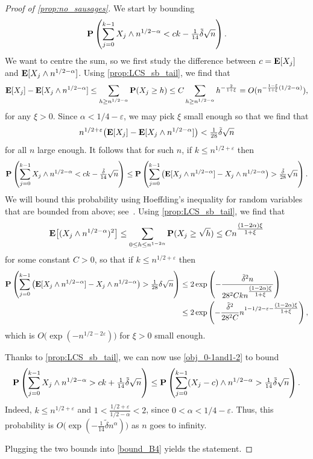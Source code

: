 \documentclass[11pt,reqno]{amsart}
\newcommand{\eps}{\varepsilon}
\begin{document}
\begin{proof}[Proof of \cref{prop:no_sausages}]
    We start by bounding 
    \[\mathbf{P}\left(\sum_{j=0}^{k-1} X_j \wedge n^{1/2-\alpha}<ck-\tfrac{1}{14}\tilde\delta \sqrt{n} \right). \]
    We want to centre the sum, so we first study the difference between $c={\mathbf E}[X_j]$ and ${\mathbf E}[X_j\wedge n^{1/2-\alpha}]$. Using \cref{prop:LCS_sb_tail}, we find that 
    \[
    {\mathbf E}[X_j]-{\mathbf E}[X_j\wedge n^{1/2-\alpha}]\le \sum_{h\ge n^{1/2-\alpha}}\mathbf{P}(X_j\ge h)\le C\sum_{h\ge n^{1/2-\alpha}} h^{-\frac{2}{1+\xi}}=O(n^{-\frac{1-\xi}{1+\xi}(1/2-\alpha)} ),
    \]
    for any $\xi>0$. Since $\alpha<1/4-\varepsilon$, we may pick $\xi$ small enough so that we find that \[n^{1/2+\varepsilon}\big({\mathbf E}[X_j]-{\mathbf E}[X_j\wedge n^{1/2-\alpha}]\big)<\tfrac{1}{28}\tilde\delta \sqrt{n}\]
    for all $n$ large enough. It follows that for such $n$, if $k \le n^{1/2+\varepsilon}$ then 
    \[\mathbf{P}\left(\sum_{j=0}^{k-1} X_j \wedge n^{1/2-\alpha}<ck-\tfrac{\tilde\delta}{14} \sqrt{n} \right)\le \mathbf{P}\left(\sum_{j=0}^{k-1} \big( {\mathbf E}[X_j \wedge n^{1/2-\alpha} ]-X_j \wedge n^{1/2-\alpha}\big)>\tfrac{\tilde\delta}{28} \sqrt{n} \right) .\]
    We will bound this probability using Hoeffding's inequality for random variables that are bounded from above; see~\cite[Corollary 2.7]{FGL_hoeffding}. Using \cref{prop:LCS_sb_tail}, we find that 
    \[{\mathbf E}\big[(X_j \wedge n^{1/2-\alpha})^2\big]\le \sum_{0\le h\le n^{1-2\alpha}}\mathbf{P}(X_j\ge \sqrt{h} )\le C n^{\tfrac{(1-2\alpha)\xi}{1+\xi}}\]
    for some constant $C>0$, so that if $k \le n^{1/2+\varepsilon}$ then
    \begin{align*}\mathbf{P}\left(\sum_{j=0}^{k-1} \big( {\mathbf E}[X_j \wedge n^{1/2-\alpha} ]-X_j \wedge n^{1/2-\alpha}\big)>\tfrac{1}{28}\delta \sqrt{n} \right)&\le 2 \exp\left(-\frac{\tilde\delta^2 n }{28^2 C k n^{\tfrac{(1-2\alpha)\xi}{1+\xi}} }\right)\\&\leq 2\exp\left(-\frac{\tilde{\delta}^2}{28^2 C} n^{1-1/2-\varepsilon-\tfrac{(1-2\alpha)\xi}{1+\xi} }\right),\end{align*}
    which is $O\big(\exp(-n^{1/2-2\eps})\big)$ for $\xi>0$ small enough. 
    
    Thanks to \cref{prop:LCS_sb_tail}, we can now use \cref{obj_0-1and1-2} to bound
    \[\mathbf{P}\left(\sum_{j=0}^{k-1} X_j \wedge n^{1/2-\alpha}>ck+\tfrac{1}{14}\tilde\delta \sqrt{n} \right)\le \mathbf{P}\left(\sum_{j=0}^{k-1} (X_j-c) \wedge n^{1/2-\alpha}>\tfrac{1}{14}\tilde\delta \sqrt{n} \right).\]
     Indeed, $k\leq n^{1/2+\varepsilon}$ and $1<\frac{1/2+\varepsilon}{1/2-\alpha}<2$, since $0<\alpha<1/4-\varepsilon$. Thus, this probability is $O\big(\exp(-\tfrac{1}{14}\tilde\delta n^\alpha)\big)$ as $n$ goes to infinity.
     
     Plugging the two bounds into \eqref{bound_B4} yields the statement.
   \end{proof}
\end{document}
